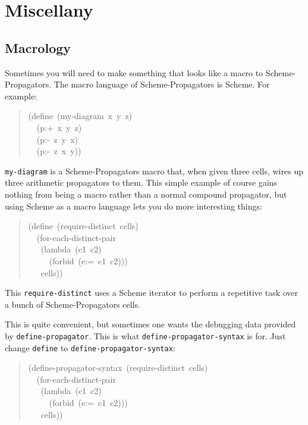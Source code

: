 \documentclass[12pt,letterpaper,english]{article}
\begin{document}

\section{Miscellany}
\label{miscellany}



\subsection{Macrology}
\label{macrology}

Sometimes you will need to make something that looks like a macro to
Scheme-Propagators.  The macro language of Scheme-Propagators is
Scheme.  For example:
\begin{quote}{\ttfamily \raggedright \noindent
(define~(my-diagram~x~y~z)~\\
~~(p:+~x~y~z)~\\
~~(p:-~z~y~x)~\\
~~(p:-~z~x~y))
}\end{quote}

\texttt{my-diagram} is a Scheme-Propagators macro that, when given three
cells, wires up three arithmetic propagators to them.  This simple
example of course gains nothing from being a macro rather
than a normal compound propagator, but using Scheme as a macro
language lets you do more interesting things:
\begin{quote}{\ttfamily \raggedright \noindent
(define~(require-distinct~cells)~\\
~~(for-each-distinct-pair~\\
~~~(lambda~(c1~c2)~\\
~~~~~(forbid~(e:=~c1~c2)))~\\
~~~cells))
}\end{quote}

This \texttt{require-distinct} uses a Scheme iterator to perform a
repetitive task over a bunch of Scheme-Propagators cells.

This is quite convenient, but sometimes one wants the debugging data
provided by \texttt{define-propagator}.  This is what
\texttt{define-propagator-syntax} is for.  Just change \texttt{define} to
\texttt{define-propagator-syntax}:
\begin{quote}{\ttfamily \raggedright \noindent
(define-propagator-syntax~(require-distinct~cells)~\\
~~(for-each-distinct-pair~\\
~~~(lambda~(c1~c2)~\\
~~~~~(forbid~(e:=~c1~c2)))~\\
~~~cells))
}\end{quote}
\end{document}
